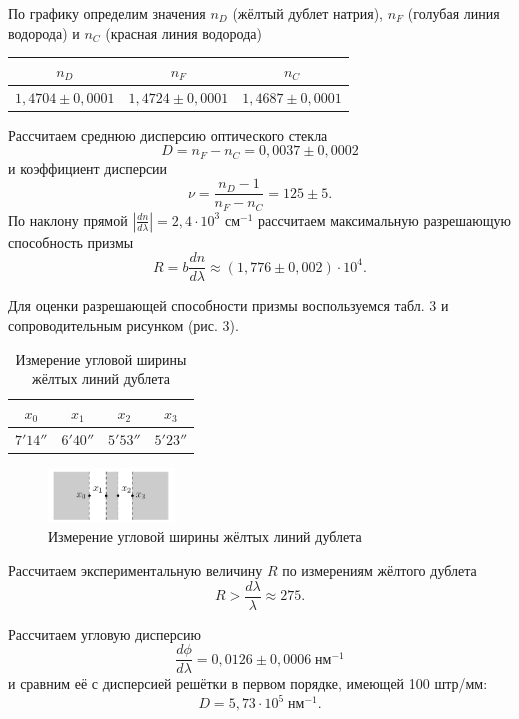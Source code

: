 \documentclass[a4paper]{article}
\begin{document}
\noindent По графику определим значения $n_D$ (жёлтый дублет натрия), $n_F$ (голубая линия водорода) и $n_C$ (красная линия водорода)

\begin{table}[!ht]
    \centering
    \begin{tabular}{|c|c|c|}
    \hline
    $n_D$  & $n_F$  & $n_C$  \\ \hline
    $1,4704 \pm 0,0001$ & $1,4724 \pm 0,0001$ & $1,4687 \pm 0,0001$ \\ \hline
    \end{tabular}
    \end{table}

\noindent Рассчитаем среднюю дисперсию оптического стекла $$D = n_F - n_C = 0,0037 \pm 0,0002$$ и коэффициент дисперсии $$\nu = \frac{n_D - 1}{n_F - n_C} = 125 \pm 5.$$ По наклону прямой $|\frac{dn}{d\lambda}| = 2,4 \cdot 10^3$ см$^{-1}$ рассчитаем максимальную разрешающую способность призмы $$R = b\frac{dn}{d\lambda} \approx (1,776 \pm 0,002)\cdot 10^4.$$

\noindent Для оценки разрешающей способности призмы воспользуемся табл. 3 и сопроводительным рисунком (рис. 3).

\begin{table}[!ht]
    \centering
    \caption{Измерение угловой ширины жёлтых линий дублета}
    \begin{tabular}{|c|c|c|c|}
    \hline
    $x_0$     & $x_1$    & $x_2$    & $x_3$    \\ \hline
    $7' 14''$ & $6'40''$ & $5'53''$ & $5'23''$ \\ \hline
    \end{tabular}
    \end{table}

\begin{figure}[ht!]
    \centering
    \includegraphics[width = 0.3\textwidth]{image/pic2.png}
    \caption{Измерение угловой ширины жёлтых линий дублета}
\end{figure}

\noindent Рассчитаем экспериментальную величину $R$ по измерениям жёлтого дублета $$R > \frac{d\lambda}{\lambda} \approx 275.$$

\noindent Рассчитаем угловую дисперсию $$\frac{d\phi}{d\lambda} = 0,0126 \pm 0,0006 \;\text{нм}^{-1}$$ и сравним её с дисперсией решётки в первом порядке, имеющей 100 штр/мм: $$D = 5,73 \cdot 10^5 \;\text{нм}^{-1}.$$
\end{document}
